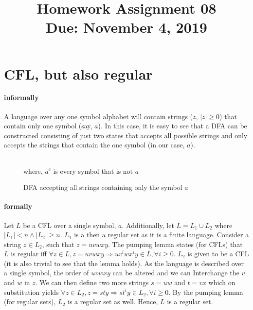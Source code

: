 \documentclass[11pt,letterpaper]{article}
\title{Homework Assignment 08 \\
    \small Due: November 4, 2019}
\begin{document}
\maketitle

\section{CFL, but also regular}
\paragraph{informally} A language over any one symbol alphabet will contain strings ($z$, $|z| \geq 0$) that contain only one symbol (say, $a$). In this case, it is easy to see that a DFA can be constructed consisting of just two states that accepts all possible strings and only accepts the strings that contain the one symbol (in our case, $a$).
\begin{figure}[ht]
\label{fig:dfa}
\centering
{} \\
where, $a^{c}$ is every symbol that is not $a$
\caption{DFA accepting all strings containing only the symbol $a$}
\end{figure}

\paragraph{formally} Let $L$ be a CFL over a single symbol, $a$. Additionally, let $L = L_1 \cup L_2$ where $|L_1| < n \wedge |L_2| \geq n$. $L_1$ is a then a regular set as it is a finite language. Consider a string $z \in L_2$, such that $z = uvwxy$. The pumping lemma states (for CFLs) that $L$ is regular iff $\forall z \in L, z = uvwxy \Rightarrow uv^iwx^iy \in L, \forall i \geq 0$. $L_2$ is given to be a CFL (it is also trivial to see that the lemma holds). As the language is described over a single symbol, the order of $uvwxy$ can be altered and we can Interchange the $v$ and $w$ in $z$. We can then define two more strings $s = uw$ and $t = vx$ which on substitution yields $\forall z \in L_2, z = sty \Rightarrow st^iy \in L_2, \forall i \geq 0$. By the pumping lemma (for regular sets), $L_2$ is a regular set as well. Hence, $L$ is a regular set.
\end{document}
